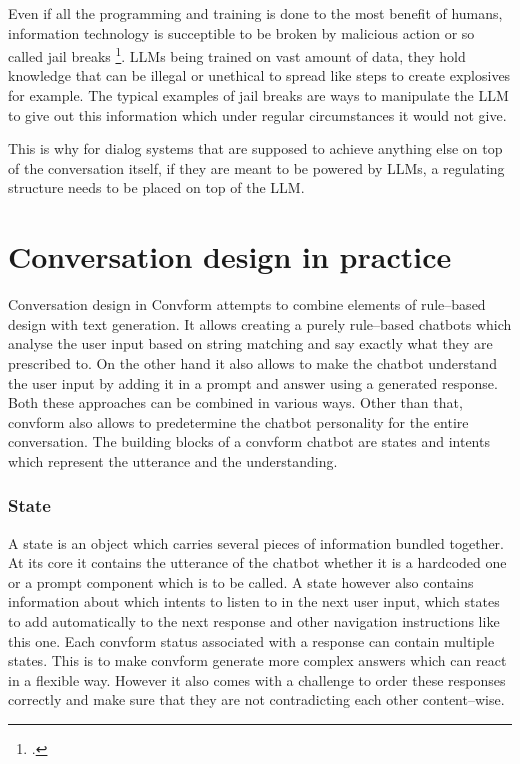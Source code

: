 \documentclass[12pt]{report}
\begin{document}
{Even if all the programming and training is done to the most benefit of humans,
information technology is succeptible to be broken by malicious action
or so called jail breaks \footcite{zhou2024don, wei2023jailbroken}.
LLMs being trained on vast amount of data,
they hold knowledge that can be illegal or unethical to spread
like steps to create explosives for example.
The typical examples of jail breaks are ways to manipulate
the LLM to give out this information
which under regular circumstances it would not give.

This is why for dialog systems that are supposed to achieve
anything else on top of the conversation itself,
if they are meant to be powered by LLMs,
a regulating structure needs to be placed on top of the LLM.

\section{Conversation design in practice}

\par
Conversation design in Convform attempts
to combine elements of rule–based design with text generation.
It allows creating a purely rule–based chatbots
which analyse the user input based on string matching
and say exactly what they are prescribed to.
On the other hand it also allows to make the chatbot
understand the user input by adding it in a prompt
and answer using a generated response.
Both these approaches can be combined in various ways.
Other than that, convform also allows to predetermine
the chatbot personality for the entire conversation.
The building blocks of a convform chatbot are
states and intents which represent the utterance and the understanding.

\subsubsection{State}
A state is an object which carries several pieces of information
bundled together.
At its core it contains the utterance of the chatbot
whether it is a hardcoded one or a prompt component which is to be called.
A state however also contains information about
which intents to listen to in the next user input,
which states to add automatically to the next response
and other navigation instructions like this one.
Each convform status associated with a response
can contain multiple states.
This is to make convform generate more complex answers
which can react in a flexible way.
However it also comes with a challenge to order these responses correctly
and make sure that they are not contradicting each other content–wise.

}
\end{document}
